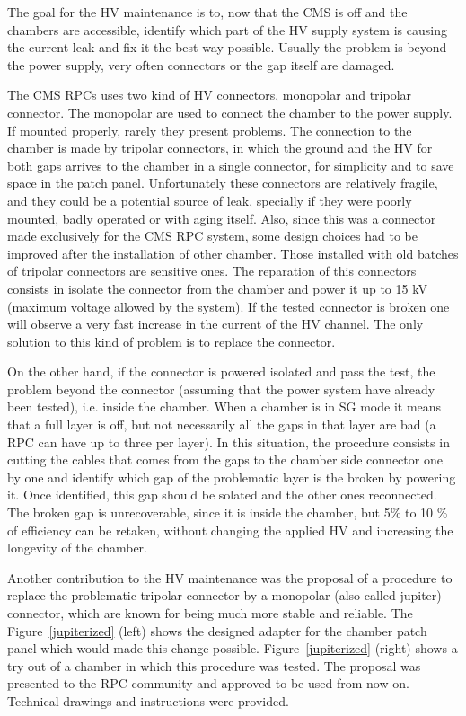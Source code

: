 The goal for the HV maintenance is to, now that the CMS is off and the chambers are accessible, identify which part of the HV supply system is causing the current leak and fix it the best way possible. Usually the problem is beyond the power supply, very often connectors or the gap itself are damaged.

The CMS RPCs uses two kind of HV connectors, monopolar and tripolar connector. The monopolar are used to connect the chamber to the power supply. If mounted properly, rarely they present problems. The connection to the chamber is made by tripolar connectors, in which the ground and the HV for both gaps arrives to the chamber in a single connector, for simplicity and to save space in the patch panel. Unfortunately these connectors are relatively fragile, and they could be a potential source of leak, specially if they were poorly mounted, badly operated or with aging itself. Also, since this was a connector made exclusively for the CMS RPC system, some design choices had to be improved after the installation of other chamber. Those installed with old batches of tripolar connectors are sensitive ones. The reparation of this connectors consists in isolate the connector from the chamber and power it up to 15 kV (maximum voltage allowed by the system). If the tested connector is broken one will observe a very fast increase in the current of the HV channel. The only solution to this kind of problem is to replace the connector.

On the other hand, if the connector is powered isolated and pass the test, the problem beyond the connector (assuming that the power system have already been tested), i.e. inside the chamber. When a chamber is in SG mode it means that a full layer is off, but not necessarily all the gaps in that layer are bad (a RPC can have up to three per layer). In this situation, the procedure consists in cutting the cables that comes from the gaps to the chamber side connector one by one and identify which gap of the problematic layer is the broken by powering it. Once identified, this gap should be solated and the other ones reconnected. The broken gap is unrecoverable, since it is inside the chamber, but 5\% to 10 \% of efficiency can be retaken, without changing the applied HV and increasing the longevity of the chamber.

Another contribution to the HV maintenance was the proposal of a procedure to replace the problematic tripolar connector by a monopolar (also called jupiter) connector, which are known for being much more stable and reliable. The Figure~\ref{jupiterized} (left) shows the designed adapter for the chamber patch panel which would made this change possible. Figure~\ref{jupiterized} (right) shows a try out of a chamber in which this procedure was tested. The proposal was presented to the RPC community and approved to be used from now on. Technical drawings and instructions were provided.


